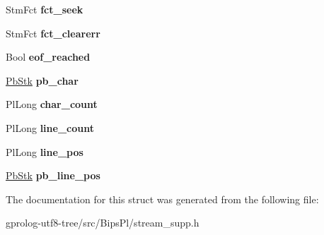 \begin{DoxyCompactItemize}
\item 
Stm\+Fct {\bfseries fct\+\_\+seek}\hypertarget{structstm__inf_a5f9d4068bafcdf0a8ced688439af8aa2}{}\label{structstm__inf_a5f9d4068bafcdf0a8ced688439af8aa2}

\item 
Stm\+Fct {\bfseries fct\+\_\+clearerr}\hypertarget{structstm__inf_afaf9188c97510a5f1d612e1444f6e801}{}\label{structstm__inf_afaf9188c97510a5f1d612e1444f6e801}

\item 
Bool {\bfseries eof\+\_\+reached}\hypertarget{structstm__inf_ac3960253b7e5f826635a196b096fd499}{}\label{structstm__inf_ac3960253b7e5f826635a196b096fd499}

\item 
\hyperlink{structPbStk}{Pb\+Stk} {\bfseries pb\+\_\+char}\hypertarget{structstm__inf_af66229bdb1421dc62daaee808af84bba}{}\label{structstm__inf_af66229bdb1421dc62daaee808af84bba}

\item 
Pl\+Long {\bfseries char\+\_\+count}\hypertarget{structstm__inf_a0c6895ef7d7a03c6f0ad2aa05be2c0af}{}\label{structstm__inf_a0c6895ef7d7a03c6f0ad2aa05be2c0af}

\item 
Pl\+Long {\bfseries line\+\_\+count}\hypertarget{structstm__inf_a0394c04b8f2bd5990d30dd6ad14a8246}{}\label{structstm__inf_a0394c04b8f2bd5990d30dd6ad14a8246}

\item 
Pl\+Long {\bfseries line\+\_\+pos}\hypertarget{structstm__inf_a89769bf2d0ca17434b431c380379e674}{}\label{structstm__inf_a89769bf2d0ca17434b431c380379e674}

\item 
\hyperlink{structPbStk}{Pb\+Stk} {\bfseries pb\+\_\+line\+\_\+pos}\hypertarget{structstm__inf_acd4b4b0e220c45642fb4a6903d6ec4d5}{}\label{structstm__inf_acd4b4b0e220c45642fb4a6903d6ec4d5}

\end{DoxyCompactItemize}


The documentation for this struct was generated from the following file\+:\begin{DoxyCompactItemize}
\item 
gprolog-\/utf8-\/tree/src/\+Bips\+Pl/stream\+\_\+supp.\+h\end{DoxyCompactItemize}
